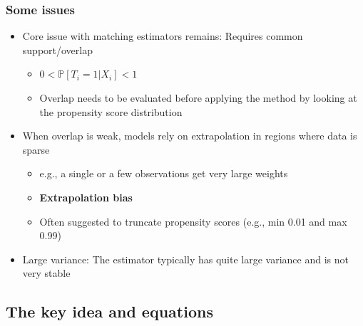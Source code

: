 \documentclass[10pt]{article}
\begin{document}
\subsubsection{Some issues}
\begin{itemize}
    \item Core issue with matching estimators remains: Requires common support/overlap
    \begin{itemize}
        \item $0 < \mathbb{P}[T_i = 1|X_i] < 1 $
        \item Overlap needs to be evaluated before applying the method by looking at the propensity score distribution 
    \end{itemize}
    \item When overlap is weak, models rely on extrapolation in regions where data is sparse 
    \begin{itemize}
        \item e.g., a single or a few observations get very large weights 
        \item \textbf{Extrapolation bias}
        \item Often suggested to truncate propensity scores (e.g., min 0.01 and max 0.99)
    \end{itemize}
    \item Large variance: The estimator typically has quite large variance and is not very stable 
\end{itemize}
\subsection{The key idea and equations}
\end{document}
